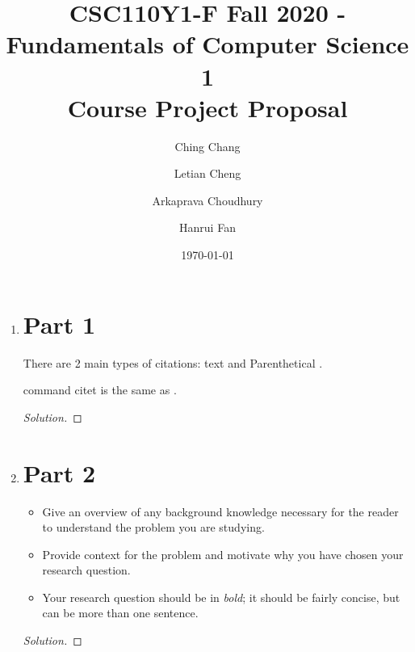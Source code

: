 \documentclass[12pt]{article}
\title{CSC110Y1-F Fall 2020 - Fundamentals of Computer Science 1 \\ Course Project Proposal}
\author{
  Ching Chang\\
  \and
  Letian Cheng\\
  \and
  Arkaprava Choudhury\\
  \and
  Hanrui Fan
}
\date{\today}
\newenvironment{solution}
  {\renewcommand\qedsymbol{$\blacksquare$}
  \begin{proof}[Solution]}
  {\end{proof}}
\renewcommand\qedsymbol{$\blacksquare$}
\begin{document}
\maketitle

\newpage


\begin{enumerate}
\item \section*{Part 1}

There are 2 main types of citations: text \citet{But20} and Parenthetical \citep{Bra20}.

command citet \citet{Mar20} is the same as \cite{Mel93}.





\begin{solution}

\end{solution}

\newpage

\item \section*{Part 2}

\begin{itemize}
  \item Give an overview of any background knowledge necessary for the reader to understand the problem you are studying.
  \item Provide context for the problem and motivate why you have chosen your research question.
  \item Your research question should be in \emph{bold}; it should be fairly concise, but can be more than one sentence.
\end{itemize}

\begin{solution}

\end{solution}


\end{enumerate}
\end{document}
